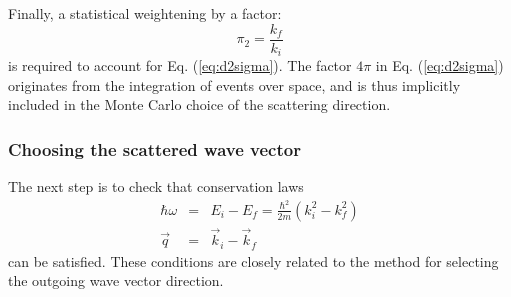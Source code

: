 Finally, a statistical weightening by a factor:
\begin{equation}
\pi_2 = \frac{k_f}{k_i}
\end{equation}
is required to account for Eq. (\ref{eq:d2sigma}). The factor $4 \pi$ in Eq. (\ref{eq:d2sigma}) originates from the integration of events over space, and is thus implicitly included in the Monte Carlo choice of the scattering direction.

\subsubsection{Choosing the scattered wave vector}

The next step is to check that conservation laws
\begin{eqnarray}
\hbar \omega &=& E_i - E_f = \frac{\hbar^2}{2m}(k_i^2 - k_f^2) \label{eq:q-transfer} \\
\vec q &=& \vec k_i - \vec k_f \label{eq:w-transfer}
\end{eqnarray}
can be satisfied. These conditions are closely related to the method for selecting the outgoing wave vector direction.


